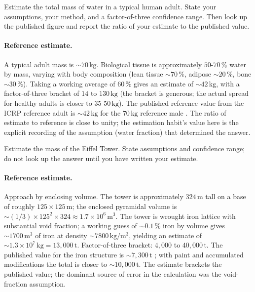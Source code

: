 \begin{exercise}
Estimate the total mass of water in a typical human adult. State
your assumptions, your method, and a factor-of-three confidence
range. Then look up the published figure and report the ratio of
your estimate to the published value.

\paragraph{Reference estimate.} A typical adult mass is
$\sim 70 \,\si{\kilogram}$. Biological tissue is approximately
$50$-$70\,\%$ water by mass, varying with body composition (lean
tissue $\sim 70\,\%$, adipose $\sim 20\,\%$, bone $\sim 30\,\%$).
Taking a working average of $60\,\%$ gives an estimate of
$\sim 42 \,\si{\kilogram}$, with a factor-of-three bracket of
$14$ to $130 \,\si{\kilogram}$ (the bracket is generous; the actual
spread for healthy adults is closer to $35$-$50 \,\si{\kilogram}$).
The published reference value from the ICRP reference adult is
$\sim 42 \,\si{\kilogram}$ for the $70 \,\si{\kilogram}$ reference
male \cite{std:icrp-89-2002}. The ratio of estimate to reference is
close to unity; the estimation habit's value here is the explicit
recording of the assumption (water fraction) that determined the
answer.
\end{exercise}

\begin{exercise}
Estimate the mass of the Eiffel Tower. State assumptions and
confidence range; do not look up the answer until you have written
your estimate.

\paragraph{Reference estimate.} Approach by enclosing volume. The
tower is approximately $324 \,\si{\meter}$ tall on a base of
roughly $125 \times 125 \,\si{\meter}$; the enclosed pyramidal
volume is $\sim (1/3) \times 125^2 \times 324 \approx 1.7 \times
10^6 \,\si{\meter\cubed}$. The tower is wrought iron lattice with
substantial void fraction; a working guess of $\sim 0.1\,\%$ iron
by volume gives $\sim 1700 \,\si{\meter\cubed}$ of iron at density
$\sim 7800 \,\si{\kilogram\per\meter\cubed}$, yielding an estimate
of $\sim 1.3 \times 10^7 \,\si{\kilogram} = 13{,}000 \,\si{\tonne}$.
Factor-of-three bracket: $4{,}000$ to $40{,}000 \,\si{\tonne}$. The
published value for the iron structure is $\sim 7{,}300 \,\si{\tonne}$
\cite{web:eiffel-tower-official}; with paint and accumulated
modifications the total is closer to $\sim 10{,}000 \,\si{\tonne}$.
The estimate brackets the published value; the dominant source of
error in the calculation was the void-fraction assumption.
\end{exercise}


